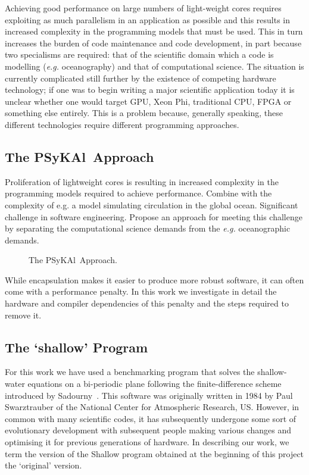 \documentclass[journal]{IEEEtran}
\newcommand{\psykal}{{PS}y{KA}l\ }
\begin{document}
Achieving good performance on large numbers of light-weight cores
requires exploiting as much parallelism in an application as possible
and this results in increased complexity in the programming models
that must be used. This in turn increases the burden of code
maintenance and code development, in part because two specialisms are
required: that of the scientific domain which a code is modelling
({\it e.g.} oceanography) and that of computational science. The
situation is currently complicated still further by the existence of
competing hardware technology; if one was to begin writing a major
scientific application today it is unclear whether one would target
GPU, Xeon Phi, traditional CPU, FPGA or something else entirely. This
is a problem because, generally speaking, these different technologies
require different programming approaches.


\subsection{The \psykal Approach}
Proliferation of lightweight cores is resulting in increased
complexity in the programming models required to achieve performance.
Combine with the complexity of e.g. a model simulating circulation in
the global ocean. Significant challenge in software engineering.
Propose an approach for meeting this challenge by separating the
computational science demands from the {\it e.g.} oceanographic
demands.

\begin{figure}
\centering
\caption{The \psykal Approach.}
\end{figure}

While encapsulation makes it easier to produce more robust software,
it can often come with a performance penalty. In this work we
investigate in detail the hardware and compiler dependencies of this
penalty and the steps required to remove it.

\subsection{The `shallow' Program}
For this work we have used a benchmarking program that solves the
shallow-water equations on a bi-periodic plane following the
finite-difference scheme introduced by Sadourny~\cite{sadourny75}.
This software was originally written in 1984 by Paul Swarztrauber of
the National Center for Atmospheric Research, US.  However, in common
with many scientific codes, it has subsequently undergone some sort of
evolutionary development with subsequent people making various changes
and optimising it for previous generations of hardware.  In describing
our work, we term the version of the Shallow program obtained at the
beginning of this project the `original' version.
\end{document}
